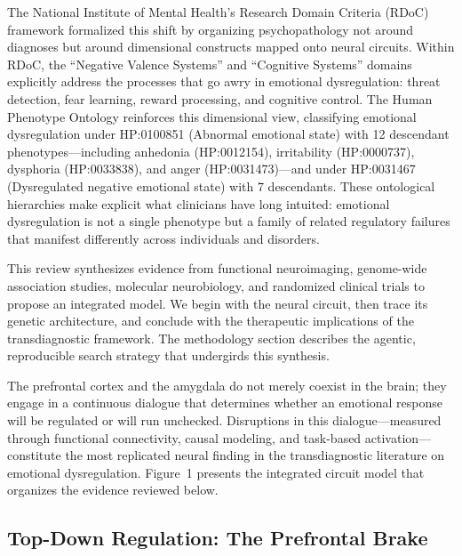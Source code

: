 The National Institute of Mental Health's Research Domain Criteria (RDoC)
framework formalized this shift by organizing psychopathology not around
diagnoses but around dimensional constructs mapped onto neural circuits.
Within RDoC, the ``Negative Valence Systems'' and ``Cognitive Systems'' domains
explicitly address the processes that go awry in emotional dysregulation:
threat detection, fear learning, reward processing, and cognitive control.  The
Human Phenotype Ontology reinforces this dimensional view, classifying emotional
dysregulation under HP:0100851 (Abnormal emotional state) with 12 descendant
phenotypes---including anhedonia (HP:0012154), irritability (HP:0000737),
dysphoria (HP:0033838), and anger (HP:0031473)---and under HP:0031467
(Dysregulated negative emotional state) with 7 descendants.  These ontological
hierarchies make explicit what clinicians have long intuited: emotional
dysregulation is not a single phenotype but a family of related regulatory
failures that manifest differently across individuals and disorders.

This review synthesizes evidence from functional neuroimaging, genome-wide
association studies, molecular neurobiology, and randomized clinical trials to
propose an integrated model.  We begin with the neural circuit, then trace its
genetic architecture, and conclude with the therapeutic implications of the
transdiagnostic framework.  The methodology section describes the agentic,
reproducible search strategy that undergirds this synthesis.




The prefrontal cortex and the amygdala do not merely coexist in the brain; they
engage in a continuous dialogue that determines whether an emotional response
will be regulated or will run unchecked.  Disruptions in this dialogue---measured
through functional connectivity, causal modeling, and task-based
activation---constitute the most replicated neural finding in the transdiagnostic
literature on emotional dysregulation.  Figure~1 presents the integrated circuit
model that organizes the evidence reviewed below.

\subsection*{Top-Down Regulation: The Prefrontal Brake}

